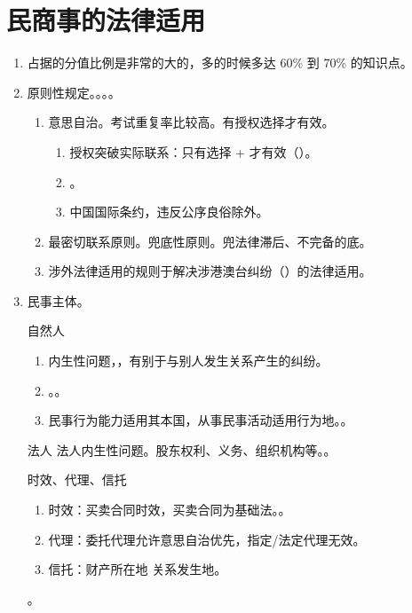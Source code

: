 \section{民商事的法律适用}
\begin{enumerate}
  \item 占据的分值比例是非常的大的，多的时候多达 60\% 到 70\% 的知识点。
  \item 原则性规定。。。。
        \begin{enumerate}
          \item 意思自治。考试重复率比较高。有授权选择才有效。
                \begin{enumerate}
                  \item 授权突破实际联系：只有选择 + 才有效（）。
                  \item {}。
                  \item 中国国际条约，违反公序良俗除外。
                \end{enumerate}
          \item 最密切联系原则。兜底性原则。兜法律滞后、不完备的底。
          \item 涉外法律适用的规则于解决涉港澳台纠纷（）的法律适用。
        \end{enumerate}
  \item 民事主体。
        \begin{kk}{自然人}
          \begin{enumerate}
            \item {}内生性问题，，有别于与别人发生关系产生的纠纷。
            \item {}。。
            \item 民事行为能力适用其本国，从事民事活动适用行为地。。
          \end{enumerate}
        \end{kk}
        \begin{kk}{法人}
          法人内生性问题。股东权利、义务、组织机构等。。
        \end{kk}
        \begin{kk}{时效、代理、信托}
          \begin{enumerate}
            \item 时效：买卖合同时效，买卖合同为基础法。。
            \item 代理：委托代理允许意思自治优先，指定/法定代理无效。
            \item 信托：财产所在地 \hz 关系发生地。
          \end{enumerate}
          \tcblower
          。
        \end{kk}
\end{enumerate}

